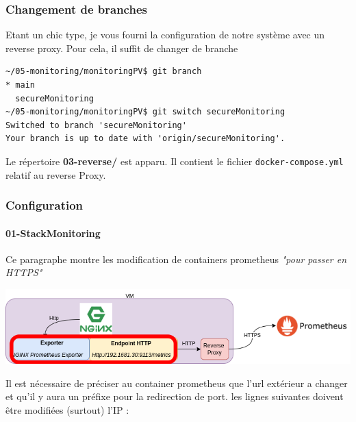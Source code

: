 \documentclass[french, 12pt]{article}%
\begin{document}
\subsubsection{Changement de branches}

Etant un chic type, je vous fourni la configuration de notre système avec un reverse proxy. 
Pour cela, il suffit de changer de branche

\begin{lstlisting}[style=commande] 
~/05-monitoring/monitoringPV$ git branch 
* main
  secureMonitoring
~/05-monitoring/monitoringPV$ git switch secureMonitoring 
Switched to branch 'secureMonitoring'
Your branch is up to date with 'origin/secureMonitoring'.
\end{lstlisting} 

Le répertoire \textbf{03-reverse/} est apparu. Il contient le fichier \verb?docker-compose.yml ? relatif au reverse Proxy. 

\subsubsection{Configuration}

\paragraph{01-StackMonitoring}

Ce paragraphe montre les modification de containers prometheus \textit{"pour passer en HTTPS"}
\begin{center}
\includegraphics[scale=0.5]{./ressource/etapeStackMonitoring.png}
\end{center}

Il est nécessaire de préciser au container prometheus que l'url extérieur a changer et qu'il y aura un préfixe pour la redirection de port. les lignes suivantes doivent être modifiées (surtout) l'IP : 
\end{document}
